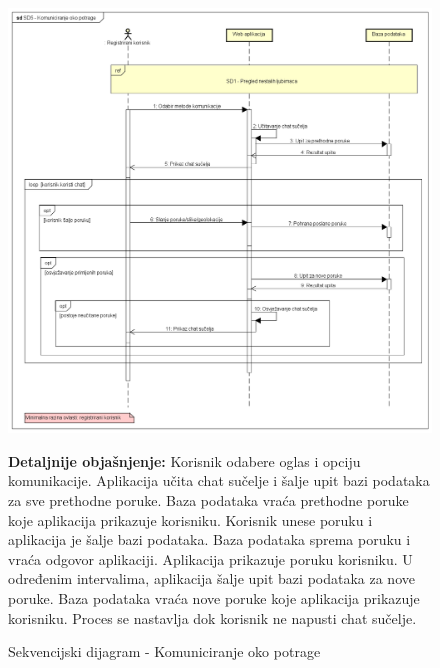 				\begin{figure}[hp!]
					\centering
					\includegraphics[width=\textwidth]{slike/SD5 - Komuniciranje oko potrage.png}
					\caption{Sekvencijski dijagram - Komuniciranje oko potrage}
					\begin{flushleft}
						\textbf{Detaljnije objašnjenje:}
						Korisnik odabere oglas i opciju komunikacije. Aplikacija učita chat sučelje i šalje upit bazi podataka za sve prethodne poruke. Baza podataka vraća prethodne poruke koje aplikacija prikazuje korisniku. Korisnik unese poruku i aplikacija je šalje bazi podataka. Baza podataka sprema poruku i vraća odgovor aplikaciji. Aplikacija prikazuje poruku korisniku. U određenim intervalima, aplikacija šalje upit bazi podataka za nove poruke. Baza podataka vraća nove poruke koje aplikacija prikazuje korisniku. Proces se nastavlja dok korisnik ne napusti chat sučelje.
					\end{flushleft}
				\end{figure}
				\pagebreak
